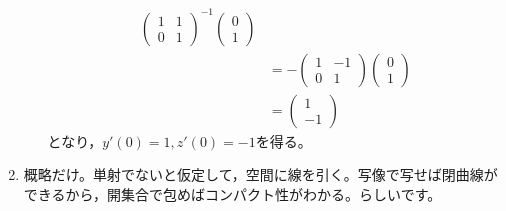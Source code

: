\documentclass[dvipdfmx,a4j,10pt]{jsarticle}
\theoremstyle{mystyle1}
\theoremstyle{mystyle2}
\begin{document}
\begin{enumerate}
\begin{enumerate}
\[\begin{split}
\begin{pmatrix}
            1 & 1\\
            0 & 1
        \end{pmatrix}^{-1}
        \begin{pmatrix}
            0 \\ 1
        \end{pmatrix}
        \\
        &=
        -\begin{pmatrix}
            1 & -1\\
            0 & 1
        \end{pmatrix}
        \begin{pmatrix}
            0 \\ 1
        \end{pmatrix}
        \\
        &=
        \begin{pmatrix}
            1 \\ -1
        \end{pmatrix}
        \end{split}
        \]
        となり，$y'(0)=1,z'(0)=-1$を得る。
    \end{enumerate}
    \item 概略だけ。単射でないと仮定して，空間に線を引く。写像で写せば閉曲線ができるから，開集合で包めばコンパクト性がわかる。らしいです。
\end{enumerate}
\end{document}
